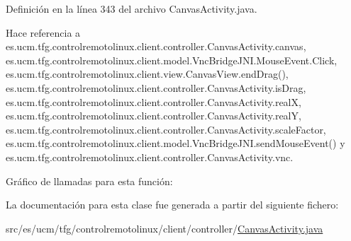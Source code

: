 Definición en la línea 343 del archivo Canvas\-Activity.\-java.



Hace referencia a es.\-ucm.\-tfg.\-controlremotolinux.\-client.\-controller.\-Canvas\-Activity.\-canvas, es.\-ucm.\-tfg.\-controlremotolinux.\-client.\-model.\-Vnc\-Bridge\-J\-N\-I.\-Mouse\-Event.\-Click, es.\-ucm.\-tfg.\-controlremotolinux.\-client.\-view.\-Canvas\-View.\-end\-Drag(), es.\-ucm.\-tfg.\-controlremotolinux.\-client.\-controller.\-Canvas\-Activity.\-is\-Drag, es.\-ucm.\-tfg.\-controlremotolinux.\-client.\-controller.\-Canvas\-Activity.\-real\-X, es.\-ucm.\-tfg.\-controlremotolinux.\-client.\-controller.\-Canvas\-Activity.\-real\-Y, es.\-ucm.\-tfg.\-controlremotolinux.\-client.\-controller.\-Canvas\-Activity.\-scale\-Factor, es.\-ucm.\-tfg.\-controlremotolinux.\-client.\-model.\-Vnc\-Bridge\-J\-N\-I.\-send\-Mouse\-Event() y es.\-ucm.\-tfg.\-controlremotolinux.\-client.\-controller.\-Canvas\-Activity.\-vnc.



Gráfico de llamadas para esta función\-:




La documentación para esta clase fue generada a partir del siguiente fichero\-:\begin{DoxyCompactItemize}
\item 
src/es/ucm/tfg/controlremotolinux/client/controller/\hyperlink{CanvasActivity_8java}{Canvas\-Activity.\-java}\end{DoxyCompactItemize}
